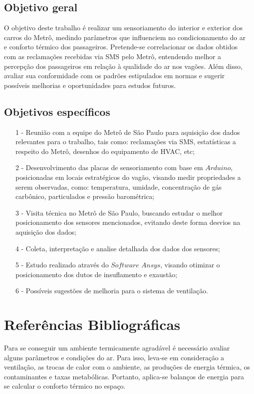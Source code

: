 \documentclass[acronym,symbols]{fei}
\begin{document}
\section{Objetivo geral}


O objetivo deste trabalho é realizar um sensoriamento do interior e exterior dos carros do Metrô, medindo parâmetros que influenciem no condicionamento do ar e conforto térmico dos passageiros. Pretende-se correlacionar os dados obtidos com as reclamações recebidas via SMS pelo Metrô, entendendo melhor a percepção dos passageiros em relação à qualidade do ar nos vagões. Além disso, avaliar sua conformidade com os padrões estipulados em normas e sugerir possíveis melhorias e oportunidades para estudos futuros.


\section{Objetivos específicos}


\begin{itemize}
    \item[1 -]Reunião com a equipe do Metrô de São Paulo para aquisição dos dados relevantes para o trabalho, tais como: reclamações via SMS, estatísticas a respeito do Metrô, desenhos do equipamento de HVAC, etc; 
    \item[2 -]Desenvolvimento das placas de sensoriamento com base em $Arduino$, posicionadas em locais estratégicos do vagão, visando medir propriedades a serem observadas, como: temperatura, umidade, concentração de gás carbônico, particulados e pressão barométrica;
    \item[3 -]Visita técnica no Metrô de São Paulo, buscando estudar o melhor posicionamento dos sensores mencionados, evitando deste forma desvios na aquisição dos dados;
    \item[4 -]Coleta, interpretação e analise detalhada dos dados dos sensores;
    \item[5 -]Estudo realizado através do $Software$ $Ansys$, visando otimizar o posicionamento dos dutos de insuflamento e exaustão;
    \item[6 -]Possíveis sugestões de melhoria para o sistema de ventilação.
\end{itemize}

\chapter{Referências Bibliográficas}

Para se conseguir um ambiente termicamente agradável é necessário avaliar alguns parâmetros e condições do ar. Para isso, leva-se em consideração a ventilação, as trocas de calor com o ambiente, as produções de energia térmica, os contaminantes e taxas metabólicas. Portanto, aplica-se balanços de energia para se calcular o conforto térmico no espaço.
\end{document}
